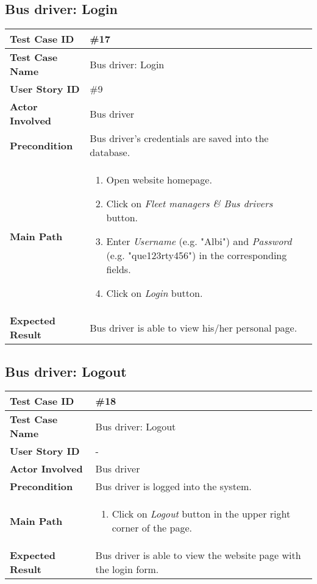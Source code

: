 \subsection{Bus driver: Login}
\begin{center}
	\begin{tabular} { | m{3.5cm} | m{9.5cm} | }
		\hline
		\textbf{Test Case ID} & \#17\\
		\hline
		\textbf{Test Case Name} & Bus driver: Login\\
		\hline
		\textbf{User Story ID} & \#9\\
		\hline
		\textbf{Actor Involved} & Bus driver\\
		\hline
		\textbf{Precondition} & Bus driver's credentials are saved into the database.\\
		\hline
		\textbf{Main Path} & 
		\begin{enumerate}
			\item Open website homepage.
			\item Click on \textit{Fleet managers \& Bus drivers} button.
			\item Enter \textit{Username} (e.g. "Albi") and \textit{Password} (e.g. "que123rty456") in the corresponding fields.
			\item Click on \textit{Login} button.
		\end{enumerate}\\
		\hline
		\textbf{Expected Result} & Bus driver is able to view his/her personal page.\\
		\hline
	\end{tabular}
\end{center}

\subsection{Bus driver: Logout}
\begin{center}
	\begin{tabular} { | m{3.5cm} | m{9.5cm} | }
		\hline
		\textbf{Test Case ID} & \#18\\
		\hline
		\textbf{Test Case Name} & Bus driver: Logout\\
		\hline
		\textbf{User Story ID} & - \\
		\hline
		\textbf{Actor Involved} & Bus driver\\
		\hline
		\textbf{Precondition} & Bus driver is logged into the system.\\
		\hline
		\textbf{Main Path} & 
		\begin{enumerate}
			\item Click on \textit{Logout} button in the upper right corner of the page.
		\end{enumerate}\\
		\hline
		\textbf{Expected Result} & Bus driver is able to view the website page with the login form.\\
		\hline
	\end{tabular}
\end{center}
\newpage
